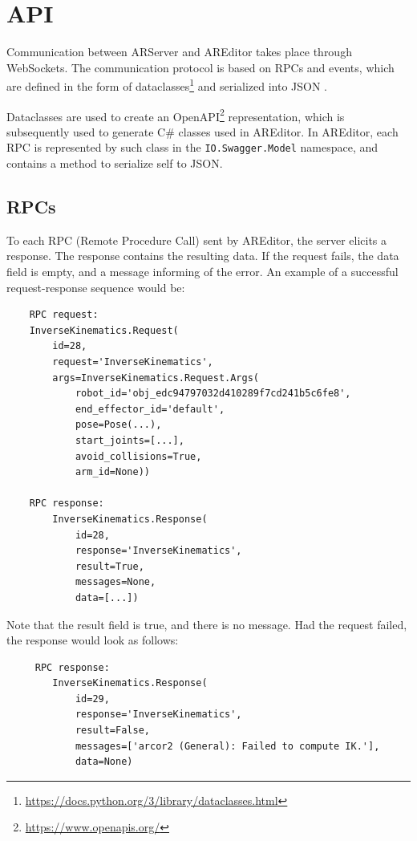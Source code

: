 \section{API}
Communication between ARServer and AREditor takes place through WebSockets. The communication protocol is based on RPCs and events, which are defined in the form of dataclasses\footnote{\url{https://docs.python.org/3/library/dataclasses.html}} and serialized into JSON . 

Dataclasses are used to create an OpenAPI\footnote{\href{https://www.openapis.org/}{https://www.openapis.org/}} representation, which is subsequently used to generate C\# classes used in AREditor. In AREditor, each RPC is represented by such class in the \texttt{IO.Swagger.Model} namespace, and contains a method to serialize self to JSON.

\subsection{RPCs}
To each RPC (Remote Procedure Call) sent by AREditor, the server elicits a response. The response contains the resulting data. If the request fails, the data field is empty, and a message informing of the error. An example of a successful request-response sequence would be: 
\begin{verbatim}
    RPC request: 
    InverseKinematics.Request(
        id=28, 
        request='InverseKinematics', 
        args=InverseKinematics.Request.Args(
            robot_id='obj_edc94797032d410289f7cd241b5c6fe8', 
            end_effector_id='default', 
            pose=Pose(...), 
            start_joints=[...], 
            avoid_collisions=True, 
            arm_id=None)) 
    
    RPC response:
        InverseKinematics.Response(
            id=28, 
            response='InverseKinematics', 
            result=True, 
            messages=None, 
            data=[...])
\end{verbatim}

Note that the result field is true, and there is no message. Had the request failed, the response would look as follows:

\begin{verbatim}
     RPC response:
        InverseKinematics.Response(
            id=29, 
            response='InverseKinematics', 
            result=False, 
            messages=['arcor2 (General): Failed to compute IK.'], 
            data=None)
\end{verbatim}

